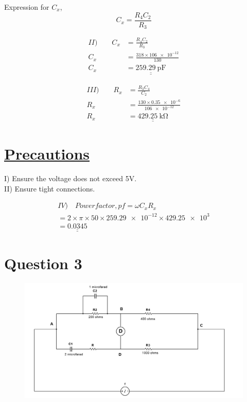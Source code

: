 \documentclass[12pt]{article}
\begin{document}
Expression for $C_x$, 
\[ C_{x} = \frac{R_{4}C_{2}}{R_{3}} \]

\begin{align*}
	II) \qquad	
	C_{x} &= \frac{R_4C_2}{R_3} \\
	C_{x} &= \frac{318\times\num{106e-12}}{130} \\
	C_{x} &= \underline{\underline{\qty{259.29}{\pico\farad}}}
\end{align*}

\vspace{2cm}

\begin{align*}
	III) \qquad	
	R_{x} &= \frac{R_3C_4}{C_2} \\
	R_{x} &= \frac{130\times\num{0.35e-6}}{\num{106e-12}} \\
	R_{x} &= \underline{\underline{\qty{429.25}{\kilo\ohm}}}
\end{align*}

\section*{\underline{Precautions}}
I) Ensure the voltage does not exceed 5V. \\
II) Ensure tight connections.

\vspace{1cm}

\begin{gather*}
IV) \quad	
Power factor, pf = \omega C_{x}R_{x} \\
= 2\times\pi\times50\times\num{259.29e-12}\times\num{429.25e3} \\
= \underline{\underline{0.0345}}
\end{gather*}	

\vspace{2cm}	 

\section*{Question 3}
\begin{figure}[H]
	\includegraphics[width=\textwidth]{number3a}
\end{figure}
\end{document}
